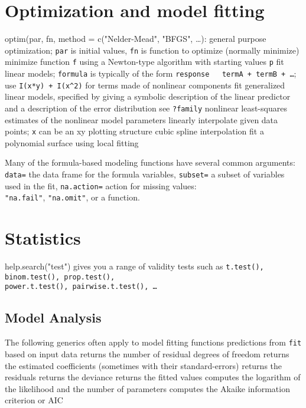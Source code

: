 \section{Optimization and model fitting}{{\smalltt optim(par, fn, method = c("Nelder-Mead", "BFGS", \ldots)}: general purpose optimization; {\tt par} is initial values, {\tt fn} is function to optimize (normally minimize)}
	{minimize function {\tt f} using a Newton-type algorithm with starting values {\tt p}}
	{fit linear models; {\tt formula} is typically of the form {\tt response ~ termA + termB + \ldots}; use {\tt I(x*y) + I(x\^{}2)} for terms made of nonlinear components}
	{fit generalized linear models, specified by giving a symbolic description of the linear predictor and a description of the error distribution}
	{see {\tt ?family}}
	{nonlinear least-squares estimates of the nonlinear model parameters}
	{linearly interpolate given data points; {\tt x} can be an xy plotting structure}
	{cubic spline interpolation}
	{fit a polynomial surface using local fitting}

Many of the formula-based modeling functions have several common
arguments: {\tt data=} the data frame for the formula variables,
{\tt subset=} a subset of variables used in the fit,
{\tt na.action=} action for missing values:\\{\tt "na.fail"}, {\tt "na.omit"}, or
a function.

\section{Statistics}{help.search("test") gives you a range of validity tests such as {\tt t.test(), binom.test(), prop.test(),\\power.t.test(), pairwise.t.test(), \ldots}}
\subsection{Model Analysis}	{The following generics often apply to model fitting functions}
	{predictions from {\tt fit} based on input data}
	{ returns the number of residual degrees of freedom}
	{ returns the estimated coefficients (sometimes with their standard-errors)}
	{ returns the residuals}
	{ returns the deviance}
	{ returns the fitted values}
	{ computes the logarithm of the likelihood and the number of parameters}
	{ computes the Akaike information criterion or AIC}

